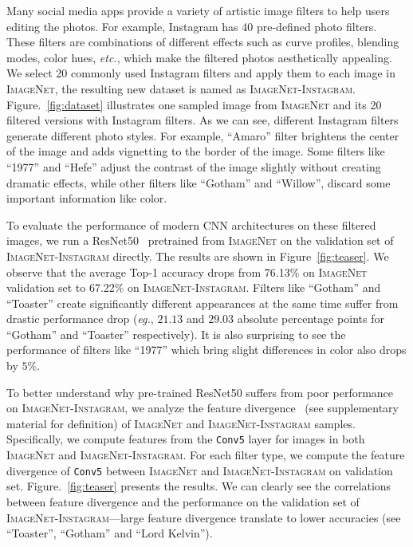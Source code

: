 \documentclass[letterpaper]{article} %
\newcommand{\instagram}{{\scshape ImageNet-Instagram}\xspace}
\newcommand{\imagenet}{{\scshape ImageNet}\xspace}
\begin{document}
Many social media apps provide a variety of artistic image filters to help users editing the photos. For example, Instagram has 40 pre-defined photo filters. These filters are combinations of different effects such as curve profiles, blending modes, color hues, \textit{etc.}, which make the filtered photos aesthetically appealing. We select 20 commonly used Instagram filters and apply them to each image in \imagenet, the resulting new dataset is named as \instagram.
Figure.~\ref{fig:dataset} illustrates one sampled image from \imagenet and its 20 filtered versions with Instagram filters. As we can see, different Instagram filters generate different photo styles. For example, ``Amaro'' filter brightens the center of the image and adds vignetting to the border of the image. Some filters like ``1977'' and ``Hefe'' adjust the contrast of the image slightly without creating dramatic effects, while other filters like ``Gotham'' and ``Willow'', discard some important information like color. 


To evaluate the performance of modern CNN architectures on these filtered images, we run a ResNet50~\cite{he2016deep} pretrained from \imagenet on the validation set of \instagram directly. The results are shown in Figure~\ref{fig:teaser}.  We observe that the average Top-1 accuracy drops from 76.13\% on  \imagenet validation set to 67.22\% on \instagram. Filters like ``Gotham'' and ``Toaster''  create significantly different appearances at the same time suffer from 
drastic performance drop (\textit{eg.}, $21.13$ and $29.03$ absolute percentage points for ``Gotham'' and ``Toaster'' respectively). It is also surprising to see the performance of filters like ``1977'' which bring slight differences in color also drops by $5\%$.

To better understand why pre-trained ResNet50 suffers from poor performance on \instagram, we analyze the feature divergence~\cite{pan2018two} (see supplementary material for definition) of \imagenet and \instagram samples. 
Specifically, we compute features from the \texttt{Conv5} layer for images in both \imagenet and \instagram. For each filter type, we compute the feature divergence of \texttt{Conv5} between \imagenet and \instagram on validation set. Figure.~\ref{fig:teaser} presents the results. 
We can clearly see the correlations between feature divergence and the performance on the validation set of \instagram---large feature divergence translate to lower accuracies (see ``Toaster'', ``Gotham'' and ``Lord Kelvin''). 
\end{document}
